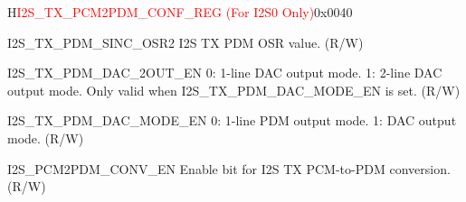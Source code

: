 \begin{register}{H}{\textcolor{red}{I2S\_TX\_PCM2PDM\_CONF\_REG (For I2S0 Only)}}{0x{}0040}\label{regdesc:I2STXPCM2PDMCONFREG}
%
%
%
%
%
%
%
\regnewline%
\begin{regdesc}\begin{reglist}
\label{fielddesc:I2STXPDMSINCOSR2}\item [I2S\_TX\_PDM\_SINC\_OSR2] I2S TX PDM OSR value. (R/W)
\label{fielddesc:I2STXPDMDAC2OUTEN}\item [I2S\_TX\_PDM\_DAC\_2OUT\_EN] 0: 1-line DAC output mode. 1: 2-line DAC output mode. Only valid when I2S\_TX\_PDM\_DAC\_MODE\_EN is set. (R/W)
\label{fielddesc:I2STXPDMDACMODEEN}\item [I2S\_TX\_PDM\_DAC\_MODE\_EN] 0: 1-line PDM output mode. 1: DAC output mode. (R/W)
\label{fielddesc:I2SPCM2PDMCONVEN}\item [I2S\_PCM2PDM\_CONV\_EN] Enable bit for I2S TX PCM-to-PDM conversion. (R/W)
\end{reglist}\end{regdesc}
\end{register}


